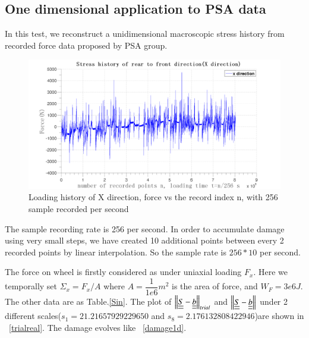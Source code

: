 \documentclass[3p,times,number,review]{elsarticle}
\newcommand{\figref}[1]{\figurename~\ref{#1}}
\begin{document}
\subsection{One dimensional application to PSA data}
In this test, we reconstruct a unidimensional macroscopic stress history from recorded force data proposed by PSA group. 
\begin{figure}[!h]
	\centering
	\includegraphics[width=\textwidth]{figures//x.png} 
	\caption{Loading history of X direction, force vs the record index n, with 256 sample recorded per second}
	\label{x}
\end{figure}

The sample recording rate is 256 per second. In order to accumulate damage using very small steps, we have created 10 additional points between every 2 recorded points by linear interpolation. So the sample rate is $256*10$ per second. 

The force on wheel is firstly considered as under uniaxial loading $F_x$. Here we temporally set $\Sigma_x=F_x/A$ where $A=\dfrac{1}{1e6} m^2$ is the area of force, and $W_F=3e6 J$. The other data are as Table.\ref{Sin}. The plot of $\left\|  \uline{\uline{S}}-\uline{\uline{b}}\right\|_{trial}$ and $\left\|  \uline{\uline{S}}-\uline{\uline{b}}\right\|$ under 2 different scales($s_1=21.21657929229650$ and $s_8=2.176132808422946$)are shown in \figref{trialreal}. The damage evolves like \figref{damage1d}.
\end{document}
